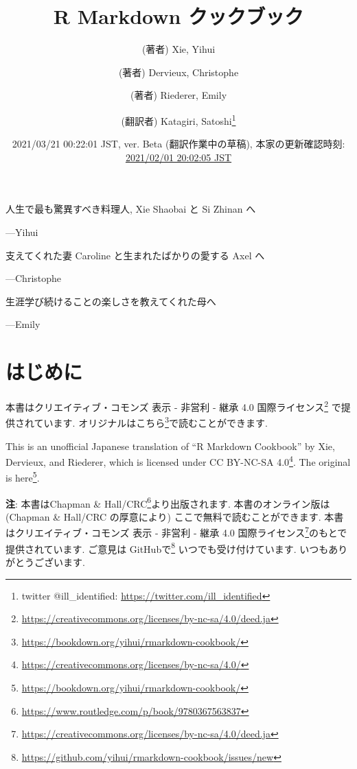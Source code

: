 \documentclass[
  11pt,
]{bxjsreport}
\title{R Markdown クックブック}
\author{(著者) Xie, Yihui \and (著者) Dervieux, Christophe \and (著者) Riederer, Emily \and (翻訳者) Katagiri, Satoshi\footnote{twitter @ill\_identified: \url{https://twitter.com/ill_identified}}}
\date{2021/03/21 00:22:01 JST, ver. Beta (翻訳作業中の草稿), 本家の更新確認時刻: \href{https://github.com/yihui/rmarkdown-cookbook}{2021/02/01 20:02:05 JST}}
\makeatletter
\renewcommand{\href}[2]{#2\footnote{\url{#1}}}
\newenvironment{kframe}{%
\medskip{}
\setlength{\fboxsep}{.8em}
 \def\at@end@of@kframe{}%
 \ifinner\ifhmode%
  \def\at@end@of@kframe{\end{minipage}}%
  \begin{minipage}{\columnwidth}%
 \fi\fi%
 \def\FrameCommand##1{\hskip\@totalleftmargin \hskip-\fboxsep
 \colorbox{shadecolor}{##1}\hskip-\fboxsep
     \hskip-\linewidth \hskip-\@totalleftmargin \hskip\columnwidth}%
 \MakeFramed {\advance\hsize-\width
   \@totalleftmargin\z@ \linewidth\hsize
   \@setminipage}}%
 {\par\unskip\endMakeFramed%
 \at@end@of@kframe}
\newenvironment{rmdblock}[1]
  {
  \begin{itemize}
  \renewcommand{\labelitemi}{
    \raisebox{-.7\height}[0pt][0pt]{
      {\setkeys{Gin}{width=3em,keepaspectratio}\texttt{[image: \_latex/\_img/\#1]}}
    }
  }
  \setlength{\fboxsep}{1em}
  \begin{kframe}
  \item
  }
  {
  \end{kframe}
  \end{itemize}
  }
\newenvironment{rmdtip}
  {\begin{rmdblock}{tip}}
  {\end{rmdblock}}
\makeatother
\begin{document}
\maketitle

\cleardoublepage\newpage\thispagestyle{empty}\null
\cleardoublepage\newpage\thispagestyle{empty}\null
\thispagestyle{empty}
\begin{large}
人生で最も驚異すべき料理人, Xie Shaobai と Si Zhinan へ
\begin{flushright}
---Yihui
\end{flushright}

\bigskip

支えてくれた妻 Caroline と生まれたばかりの愛する Axel へ
\begin{flushright}
---Christophe
\end{flushright}

\bigskip

生涯学び続けることの楽しさを教えてくれた母へ
\begin{flushright}
---Emily
\end{flushright}
\end{large}

\setlength{\abovedisplayskip}{-5pt}
\setlength{\abovedisplayshortskip}{-5pt}

{
\hypersetup{linkcolor=}
\setcounter{tocdepth}{2}
\tableofcontents
}
\listoftables
\listoffigures
\hypertarget{ux306fux3058ux3081ux306b}{%
\chapter*{はじめに}\label{ux306fux3058ux3081ux306b}}

\begin{rmdtip}
本書は\href{https://creativecommons.org/licenses/by-nc-sa/4.0/deed.ja}{クリエイティブ・コモンズ
表示 - 非営利 - 継承 4.0 国際ライセンス} で提供されています.
オリジナルは\href{https://bookdown.org/yihui/rmarkdown-cookbook/}{こちら}で読むことができます.

This is an unofficial Japanese translation of ``R Markdown Cookbook'' by
Xie, Dervieux, and Riederer, which is licensed under
\href{https://creativecommons.org/licenses/by-nc-sa/4.0/}{CC BY-NC-SA
4.0}. The original is
\href{https://bookdown.org/yihui/rmarkdown-cookbook/}{here}.
\end{rmdtip}

\textbf{注}: 本書は\href{https://www.routledge.com/p/book/9780367563837}{Chapman \& Hall/CRC}より出版されます. 本書のオンライン版は (Chapman \& Hall/CRC の厚意により) ここで無料で読むことができます. 本書は\href{https://creativecommons.org/licenses/by-nc-sa/4.0/deed.ja}{クリエイティブ・コモンズ 表示 - 非営利 - 継承 4.0 国際ライセンス}のもとで提供されています. ご意見は \href{https://github.com/yihui/rmarkdown-cookbook/issues/new}{GitHubで} いつでも受け付けています. いつもありがとうございます.
\end{document}
